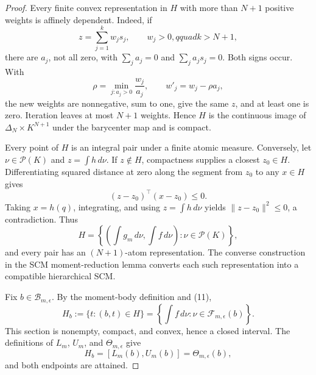 \documentclass{article}
\begin{document}
\begin{proof}
Every finite convex representation in \(H\) with more than \(N+1\) positive weights is affinely dependent.  Indeed, if
\[
 z=\sum_{j=1}^kw_js_j,\qquad w_j>0,qquad k>N+1,
\]
there are \(a_j\), not all zero, with \(\sum_ja_j=0\) and \(\sum_ja_js_j=0\).  Both signs occur.  With
\[
 \rho=\min_{j:a_j>0}\frac{w_j}{a_j},
 \qquad w'_j=w_j-\rho a_j,
\tag{9}
\]
the new weights are nonnegative, sum to one, give the same \(z\), and at least one is zero.  Iteration leaves at most \(N+1\) weights.  Hence \(H\) is the continuous image of \(\Delta_N\times K^{N+1}\) under the barycenter map and is compact.

Every point of \(H\) is an integral pair under a finite atomic measure.  Conversely, let \(\nu\in\mathcal P(K)\) and \(z=\int h\,d\nu\).  If \(z\notin H\), compactness supplies a closest \(z_0\in H\).  Differentiating squared distance at zero along the segment from \(z_0\) to any \(x\in H\) gives
\[
 (z-z_0)^{\top}(x-z_0)\leq0.
\tag{10}
\]
Taking \(x=h(q)\), integrating, and using \(z=\int h\,d\nu\) yields \(\lVert z-z_0\rVert^2\leq0\), a contradiction.  Thus
\[
 H=\left\{\left(\int g_m\,d\nu,\int f\,d\nu\right):\nu\in\mathcal P(K)\right\},
\tag{11}
\]
and every pair has an \((N+1)\)-atom representation.  The converse construction in the SCM moment-reduction lemma converts each such representation into a compatible hierarchical SCM.

Fix \(b\in\mathcal B_{m,\epsilon}\).  By the moment-body definition and (11),
\[
 H_b:=\{t:(b,t)\in H\}
 =\left\{\int f\,d\nu:\nu\in\mathcal F_{m,\epsilon}(b)\right\}.
\tag{12}
\]
This section is nonempty, compact, and convex, hence a closed interval.  The definitions of \(L_m\), \(U_m\), and \(\Theta_{m,\epsilon}\) give
\[
 H_b=[L_m(b),U_m(b)]=\Theta_{m,\epsilon}(b),
\tag{13}
\]
and both endpoints are attained.


\end{proof}
\end{document}
